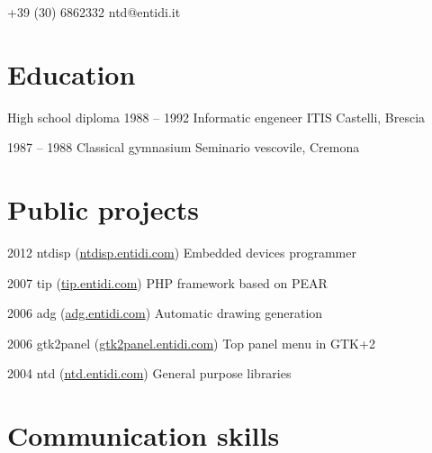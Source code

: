 \documentclass{tccv}
\begin{document}
\hfill
%
%
\begin{minipage}[t]{0.44\linewidth}
\vspace{0pt} %

    {+39 (30) 6862332}
    {ntd@entidi.it}

\section{Education}

\begin{yearlist}

\item[High school diploma]{1988 -- 1992}
     {Informatic engeneer}
     {ITIS Castelli, Brescia}

\item{1987 -- 1988}
     {Classical gymnasium}
     {Seminario vescovile, Cremona}

\end{yearlist}


\section{Public projects}

\begin{yearlist}

\item{2012}
     {ntdisp (\href{http://ntdisp.entidi.com/}{ntdisp.entidi.com})}
     {Embedded devices programmer}

\item{2007}
     {tip (\href{http://tip.entidi.com/}{tip.entidi.com})}
     {PHP framework based on PEAR}

\item{2006}
     {adg (\href{http://adg.entidi.com/}{adg.entidi.com})}
     {Automatic drawing generation}

\item{2006}
     {gtk2panel (\href{http://gtk2panel.entidi.com/}{gtk2panel.entidi.com})}
     {Top panel menu in GTK+2}

\item{2004}
     {ntd (\href{http://ntd.entidi.com/}{ntd.entidi.com})}
     {General purpose libraries}

\end{yearlist}

\section{Communication skills}


\end{minipage}
\end{document}
